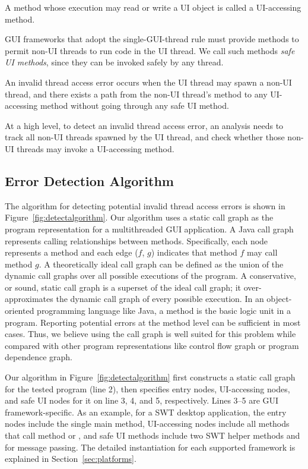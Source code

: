  { A method
whose execution may read or write a UI object is called a UI-accessing method.}\vspace{1mm}

 {GUI frameworks that
adopt the single-GUI-thread rule must provide methods to permit non-UI threads
to run code in the UI thread. We call such methods \textit{safe UI methods}, since
they can be invoked safely by any thread.}\vspace{1mm}

 {An invalid
thread access error occurs when the UI thread may spawn a non-UI thread, and there
exists a path from the non-UI thread's  method to any UI-accessing method
without going through any safe UI method. }\vspace{2mm}

At a high level, to detect an invalid thread access error, an analysis needs to track all
non-UI threads spawned by the UI thread, and check whether those non-UI threads
may invoke a UI-accessing method.

\subsection{Error Detection Algorithm}

The algorithm for detecting potential invalid thread access errors
is shown in Figure~\ref{fig:detectalgorithm}. Our algorithm uses a
static call graph as the program representation for a multithreaded
GUI application. A Java call graph represents calling relationships
between methods. Specifically, each node represents a method and each
edge ($f$, $g$) indicates that method $f$ may call method $g$.
A theoretically ideal call graph can be defined as the union of the
dynamic call graphs over all possible executions of the program. 
A conservative, or sound, static call graph is a superset of
the ideal call graph; it over-approximates the
dynamic call graph of every possible execution. 
In an object-oriented programming language like
Java, a method is the basic logic unit in a program. Reporting
potential errors at the method level can be sufficient in most cases.
Thus, we believe using the call graph is well suited for this problem while
compared with other program representations like control flow graph or
program dependence graph. 


Our algorithm in Figure~\ref{fig:detectalgorithm} %
first constructs a static call graph for the tested program (line 2),
then specifies entry nodes, UI-accessing nodes, and safe UI nodes
for it on line 3, 4, and 5, respectively. Lines 3--5 are GUI framework-specific.
As an example, for a SWT desktop application, the entry nodes include
the single main method, UI-accessing nodes include all methods that
call method  or ,
and safe UI methods include two SWT helper methods   and
 for message passing. The detailed instantiation
for each supported framework is explained in Section~\ref{sec:platforms}.

